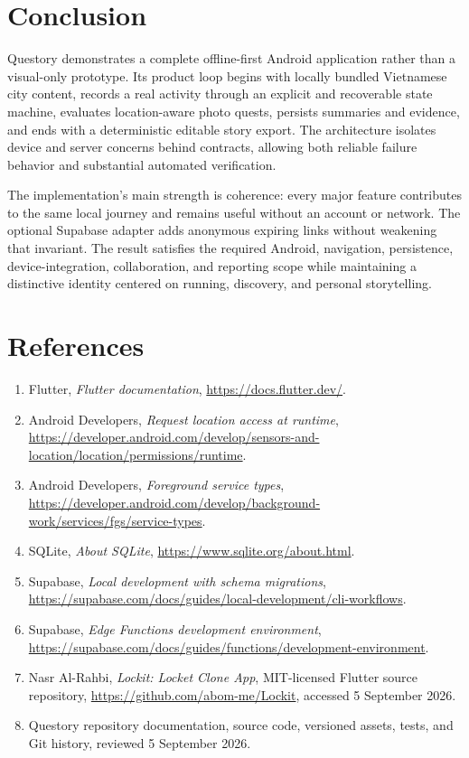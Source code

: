 \section{Conclusion}
Questory demonstrates a complete offline-first Android application rather than a
visual-only prototype. Its product loop begins with locally bundled Vietnamese
city content, records a real activity through an explicit and recoverable state
machine, evaluates location-aware photo quests, persists summaries and evidence,
and ends with a deterministic editable story export. The architecture isolates
device and server concerns behind contracts, allowing both reliable failure
behavior and substantial automated verification.

The implementation's main strength is coherence: every major feature contributes
to the same local journey and remains useful without an account or network. The
optional Supabase adapter adds anonymous expiring links without weakening that
invariant. The result satisfies the required Android, navigation, persistence,
device-integration, collaboration, and reporting scope while maintaining a
distinctive identity centered on running, discovery, and personal storytelling.

\section*{References}
\begin{enumerate}
  \item Flutter, \emph{Flutter documentation}, \url{https://docs.flutter.dev/}.
  \item Android Developers, \emph{Request location access at runtime},
        \url{https://developer.android.com/develop/sensors-and-location/location/permissions/runtime}.
  \item Android Developers, \emph{Foreground service types},
        \url{https://developer.android.com/develop/background-work/services/fgs/service-types}.
  \item SQLite, \emph{About SQLite}, \url{https://www.sqlite.org/about.html}.
  \item Supabase, \emph{Local development with schema migrations},
        \url{https://supabase.com/docs/guides/local-development/cli-workflows}.
  \item Supabase, \emph{Edge Functions development environment},
        \url{https://supabase.com/docs/guides/functions/development-environment}.
  \item Nasr Al-Rahbi, \emph{Lockit: Locket Clone App}, MIT-licensed Flutter
        source repository, \url{https://github.com/abom-me/Lockit}, accessed
        5 September 2026.
  \item Questory repository documentation, source code, versioned assets, tests,
        and Git history, reviewed 5 September 2026.
\end{enumerate}
